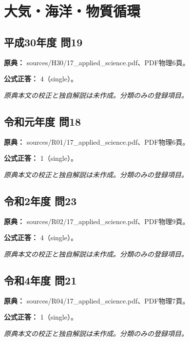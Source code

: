 \section{大気・海洋・物質循環}

\subsection{平成30年度 問19}
\label{q:h30-reg-applied-19}

\noindent\textbf{原典：} sources/H30/17\_applied\_science.pdf、PDF物理6頁。

\textbf{公式正答：} 4（single）。

\par\textit{原典本文の校正と独自解説は未作成。分類のみの登録項目。}

\subsection{令和元年度 問18}
\label{q:r01-reg-applied-18}

\noindent\textbf{原典：} sources/R01/17\_applied\_science.pdf、PDF物理6頁。

\textbf{公式正答：} 1（single）。

\par\textit{原典本文の校正と独自解説は未作成。分類のみの登録項目。}

\subsection{令和2年度 問23}
\label{q:r02-reg-applied-23}

\noindent\textbf{原典：} sources/R02/17\_applied\_science.pdf、PDF物理9頁。

\textbf{公式正答：} 4（single）。

\par\textit{原典本文の校正と独自解説は未作成。分類のみの登録項目。}

\subsection{令和4年度 問21}
\label{q:r04-reg-applied-21}

\noindent\textbf{原典：} sources/R04/17\_applied\_science.pdf、PDF物理7頁。

\textbf{公式正答：} 1（single）。

\par\textit{原典本文の校正と独自解説は未作成。分類のみの登録項目。}

